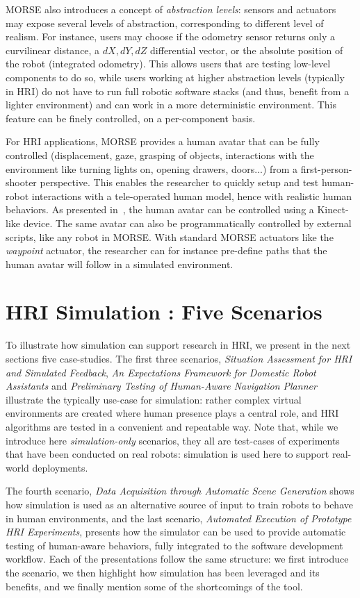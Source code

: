 \documentclass{llncs}
\begin{document}
MORSE also introduces a concept of \emph{abstraction levels}: sensors and actuators
may expose several levels of abstraction, corresponding to different level of
realism. For instance, users may choose if the odometry sensor returns only a
curvilinear distance, a $dX, dY, dZ$ differential vector, or the absolute
position of the robot (integrated odometry). This allows users that are testing
low-level components to do so, while users working at higher abstraction
levels (typically in HRI) do not have to run full robotic software stacks (and
thus, benefit from a lighter environment) and can work in a more deterministic
environment. This feature can be finely controlled, on a per-component basis.

For HRI applications, MORSE provides a human avatar that can be fully controlled
(displacement, gaze, grasping of objects, interactions with the environment like
turning lights on, opening drawers, doors...) from a first-person-shooter perspective.
This enables the researcher to quickly setup and test human-robot interactions
with a tele-operated human model, hence with realistic human behaviors. As
presented in~\cite{lemaignan2012morse}, the human avatar can be controlled using
a Kinect-like device. The same avatar can also be programmatically controlled
by external scripts, like any robot in MORSE. With standard MORSE actuators like
the \emph{waypoint} actuator, the researcher can for instance pre-define paths
that the human avatar will follow in a simulated environment.

\section{HRI Simulation : Five Scenarios}

To illustrate how simulation can support research in HRI, we present in the next
sections five case-studies.  The first three scenarios, \emph{Situation
Assessment for HRI and Simulated Feedback}, \emph{An Expectations Framework for
Domestic Robot Assistants} and \emph{Preliminary Testing of Human-Aware
Navigation Planner} illustrate the typically use-case for simulation: rather
complex virtual environments are created where human presence plays a
central role, and HRI algorithms are tested in a convenient and repeatable way.
Note that, while we introduce here \emph{simulation-only} scenarios, they all
are test-cases of experiments that have been conducted on real robots:
simulation is used here to support real-world deployments.

The fourth scenario, \emph{Data Acquisition through Automatic Scene Generation}
shows how simulation is used as an alternative source of input to train robots to
behave in human environments, and the last scenario, \emph{Automated Execution
of Prototype HRI Experiments}, presents how the simulator can be used to provide
automatic testing of human-aware behaviors, fully integrated to the software
development workflow. Each of the presentations follow the same structure: we
first introduce the scenario, we then highlight how simulation has been leveraged
and its benefits, and we finally mention some of the shortcomings of the tool.
\end{document}
